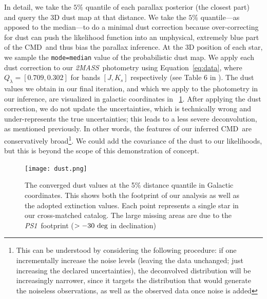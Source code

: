 \documentclass[modern]{aastex61}
\newcommand{\acronym}[1]{{\small{#1}}}
\newcommand{\project}[1]{\textsl{#1}}
\newcommand{\tmass}{\project{\acronym{2MASS}}}
\newcommand{\psone}{\project{\acronym{PS1}}}
\newcommand{\cmd}{\acronym{CMD}}
\begin{document}
In detail, we take the $5\%$
quantile of each parallax posterior (the closest part) and query the 3D dust map at that distance.
We take the $5\%$ quantile---as apposed to the median---to do a minimal dust
correction because over-correcting for dust can push the likelihood
function into an unphysical, extremely blue part of the \cmd\ and thus bias the
parallax inference. At the 3D position of each star, we sample the \texttt{mode=median} value of the probabilistic dust map.
We apply each dust correction to our
\tmass\ photometry using Equation~\ref{eq:data}, where $Q_{\lambda}
= [0.709, 0.302]$ for bands $[J, K_s]$ respectively (see Table 6 in
\citealt{schlafly11}).
The dust values we obtain in our final
iteration, and which we apply to the photometry in our inference, are visualized in
galactic coordinates in \figurename~\ref{fig:dust}.
After applying the dust correction, we do not update the uncertainties, which is
technically wrong and under-represents the true uncertainties; this leads to a less severe deconvolution, as mentioned previously.
In other words, the features of our inferred
  \cmd\ are conservatively broad\footnote{This can be understood by considering the following procedure: if one incrementally increase the noise levels (leaving the data unchanged; just increasing the declared uncertainties), the deconvolved distribution will be increasingly narrower, since it targets the distribution that would generate the noiseless observations, as well as the observed data once noise is added}. We could add the covariance of
the dust to our likelihoods, but this is beyond the scope of this
demonstration of concept.
\begin{figure}
\centering
  \texttt{[image: dust.png]}
\caption{The converged dust values at the 5\% distance quantile in Galactic coordinates. This shows both the footprint of our analysis as well as the adopted extinction values. Each point represents a single star in our cross-matched catalog. The large missing areas are due to the \psone\ footprint ($>-30~{\rm deg}$ in declination)}
\label{fig:dust}
\end{figure}
\end{document}
